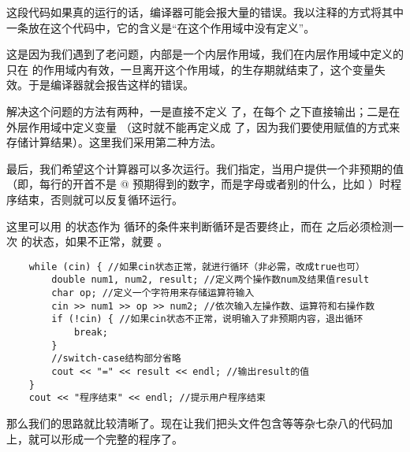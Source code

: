 这段代码如果真的运行的话，编译器可能会报大量的错误。我以注释的方式将其中一条放在这个代码中，它的含义是``\lstinline@result@ 在这个作用域中没有定义''。\par
这是因为我们遇到了老问题，\lstinline@switch@ 内部是一个内层作用域，我们在内层作用域中定义的 \lstinline@result@ 只在 \lstinline@switch@ 的作用域内有效，一旦离开这个作用域，\lstinline@result@ 的生存期就结束了，这个变量失效。于是编译器就会报告这样的错误。\par
解决这个问题的方法有两种，一是直接不定义 \lstinline@result@ 了，在每个 \lstinline@case@ 之下直接输出；二是在外层作用域中定义变量 \lstinline@result@（这时就不能再定义成 \lstinline@const@ 了，因为我们要使用赋值的方式来存储计算结果）。这里我们采用第二种方法。\par
最后，我们希望这个计算器可以多次运行。我们指定，当用户提供一个非预期的值（即，每行的开首不是 @ 预期得到的数字，而是字母或者别的什么，比如 \lstinline@q@ 
）时程序结束，否则就可以反复循环运行。\par
这里可以用 \lstinline@cin@ 的状态作为 \lstinline@while@ 循环的条件来判断循环是否要终止，而在 \lstinline@cin@ 之后必须检测一次 \lstinline@cin@ 的状态，如果不正常，就要 \lstinline@break@。
\begin{lstlisting}
    while (cin) { //如果cin状态正常，就进行循环（非必需，改成true也可）
        double num1, num2, result; //定义两个操作数num及结果值result
        char op; //定义一个字符用来存储运算符输入
        cin >> num1 >> op >> num2; //依次输入左操作数、运算符和右操作数
        if (!cin) { //如果cin状态不正常，说明输入了非预期内容，退出循环
            break;
        }
        //switch-case结构部分省略
        cout << "=" << result << endl; //输出result的值
    }
    cout << "程序结束" << endl; //提示用户程序结束
\end{lstlisting}\par
那么我们的思路就比较清晰了。现在让我们把头文件包含等等杂七杂八的代码加上，就可以形成一个完整的程序了。\par
